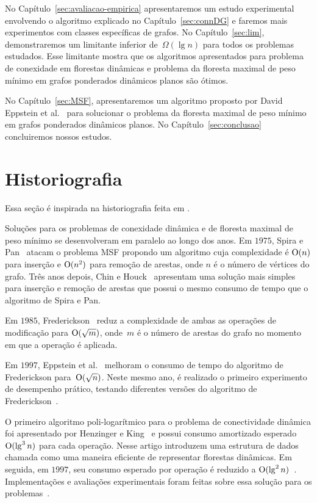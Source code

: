 No Capítulo~\ref{sec:avaliacao-empirica} apresentaremos um estudo experimental envolvendo o algoritmo explicado no Capítulo~\ref{sec:connDG} e faremos mais experimentos com classes específicas de grafos. No Capítulo~\ref{sec:lim}, demonstraremos um limitante inferior de~$\Omega(\lg n)$ para todos os problemas estudados. Esse limitante mostra que os algoritmos apresentados para problema de conexidade em florestas dinâmicas e problema da floresta maximal de peso mínimo em grafos ponderados dinâmicos planos são ótimos.

No Capítulo~\ref{sec:MSF}, apresentaremos um algoritmo proposto por David Eppstein et al.~\cite{EPPSTEIN-planar} para solucionar o problema da floresta maximal de peso mínimo em grafos ponderados dinâmicos planos. No Capítulo~\ref{sec:conclusao} concluiremos nossos estudos.

\section{Historiografia}

Essa seção é inspirada na historiografia feita em \cite{QC22, HHSRecentAdvances2022, bruceM}.

Soluções para os problemas de conexidade dinâmica e de floresta maximal de peso mínimo se desenvolveram em paralelo ao longo dos anos. Em $1975$, Spira e Pan~\cite{SP1975} atacam o problema MSF propondo um algoritmo cuja complexidade é $\mathrm{O}(n)$ para inserção e $\mathrm{O}(n^2)$ para remoção de arestas, onde $n$ é o número de vértices do grafo. Três anos depois, Chin e Houck~\cite{CH1978} apresentam uma solução mais simples para inserção e remoção de arestas que possui o mesmo consumo de tempo que o algoritmo de Spira e Pan.

Em $1985$, Frederickson~\cite{frederickson1983data} reduz a complexidade de ambas as operações de modificação para $\mathrm{O}(\sqrt{m})$, onde~$m$ é o número de arestas do grafo no momento em que a operação é aplicada.

Em $1997$, Eppstein et al.~\cite{Eppstein1992SparsificationaTF} melhoram o consumo de tempo do algoritmo de Frederickson para~$\mathrm{O}(\sqrt{n})$.
Neste mesmo ano, é realizado o primeiro experimento de desempenho prático, testando diferentes versões do algoritmo de Frederickson~\cite{xpAnalyGiuseppe}.

O primeiro algoritmo poli-logarítmico para o problema de conectividade dinâmica foi apresentado por Henzinger e King~\cite{HenzingerKing} e possui consumo amortizado esperado $\mathrm{O}(\lg^3 n)$ para cada operação. Nesse artigo introduzem uma estrutura de dados chamada  como uma maneira eficiente de representar florestas dinâmicas. Em seguida, em $1997$, seu consumo esperado por operação é reduzido a $\mathrm{O}(\lg^2 n)$~\cite{HenzingerThorup}.  Implementações e avaliações experimentais foram feitas sobre essa solução para os problemas~\cite{EmpiricalStudy1997, EmpiricalStudy2002, Zaroliagis2002}.

